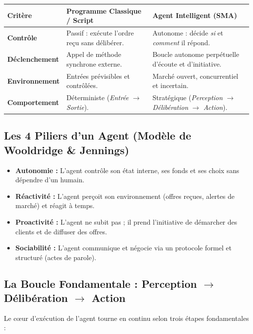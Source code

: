 \documentclass[11pt,a4paper]{article}
\begin{document}
\begin{center}
\small
\begin{tabularx}{\textwidth}{p{3cm} X X}
\toprule
\textbf{Critère} & \textbf{Programme Classique / Script} & \textbf{Agent Intelligent (SMA)} \\
\midrule
\textbf{Contrôle} & Passif : exécute l'ordre reçu sans délibérer. & Autonome : décide \textit{si} et \textit{comment} il répond. \\
\textbf{Déclenchement} & Appel de méthode synchrone externe. & Boucle autonome perpétuelle d'écoute et d'initiative. \\
\textbf{Environnement} & Entrées prévisibles et contrôlées. & Marché ouvert, concurrentiel et incertain. \\
\textbf{Comportement} & Déterministe (\textit{Entrée} $\rightarrow$ \textit{Sortie}). & Stratégique (\textit{Perception} $\rightarrow$ \textit{Délibération} $\rightarrow$ \textit{Action}). \\
\bottomrule
\end{tabularx}
\end{center}

\subsection{Les 4 Piliers d'un Agent (Modèle de Wooldridge \& Jennings)}
\begin{itemize}[leftmargin=*, itemsep=1.5pt]
    \item \textbf{Autonomie :} L'agent contrôle son état interne, ses fonds et ses choix sans dépendre d'un humain.
    \item \textbf{Réactivité :} L'agent perçoit son environnement (offres reçues, alertes de marché) et réagit à temps.
    \item \textbf{Proactivité :} L'agent ne subit pas ; il prend l'initiative de démarcher des clients et de diffuser des offres.
    \item \textbf{Sociabilité :} L'agent communique et négocie via un protocole formel et structuré (actes de parole).
\end{itemize}

\subsection{La Boucle Fondamentale : Perception \texorpdfstring{$\rightarrow$}{->} Délibération \texorpdfstring{$\rightarrow$}{->} Action}
Le cœur d'exécution de l'agent tourne en continu selon trois étapes fondamentales :
\end{document}
